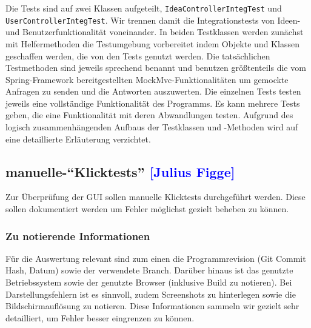 Die Tests sind auf zwei Klassen aufgeteilt, \texttt{IdeaControllerIntegTest} und \texttt{UserControllerIntegTest}. Wir trennen damit die Integrationstests von Ideen- und Benutzerfunktionalität voneinander. In beiden Testklassen werden zunächst mit Helfermethoden die Testumgebung vorbereitet indem Objekte und Klassen geschaffen werden, die von den Tests genutzt werden.
Die tatsächlichen Testmethoden sind jeweils sprechend benannt und benutzen größtenteils die vom Spring-Framework bereitgestellten MockMvc-Funktionalitäten um gemockte Anfragen zu senden und die Antworten auszuwerten. Die einzelnen Tests testen jeweils eine vollständige Funktionalität des Programms. Es kann mehrere Tests geben, die eine Funktionalität mit deren Abwandlungen testen.
Aufgrund des logisch zusammenhängenden Aufbaus der Testklassen und -Methoden wird auf eine detaillierte Erläuterung verzichtet.

\subsection{manuelle-\enquote{Klicktests} \textcolor{blue}{[Julius Figge]}}

Zur Überprüfung der GUI sollen manuelle Klicktests durchgeführt werden.
Diese sollen dokumentiert werden um Fehler möglichst gezielt beheben zu können.\\

\subsubsection*{Zu notierende Informationen}
Für die Auswertung relevant sind zum einen die Programmrevision (Git Commit Hash, Datum) sowie der verwendete Branch. Darüber hinaus ist das genutzte Betriebssystem sowie der genutzte Browser (inklusive Build zu notieren).
Bei Darstellungsfehlern ist es sinnvoll, zudem Screenshots zu hinterlegen sowie die Bildschirmauflösung zu notieren.
Diese Informationen sammeln wir gezielt sehr detailliert, um Fehler besser eingrenzen zu können.

